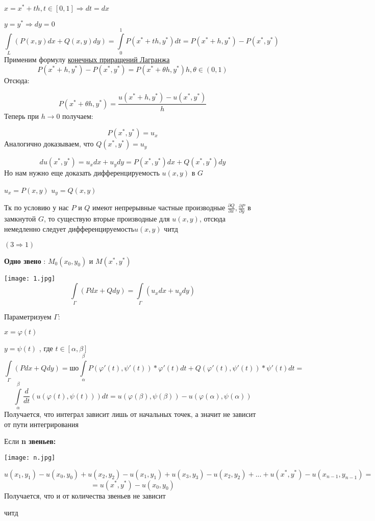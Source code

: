 \documentclass[12pt, english]{article}
\begin{document}
	$x = x^* + th , t \in [0,1] \Rightarrow dt = dx$
	
	$y = y^* \Rightarrow dy = 0$
$$
\int\limits_{L} (P(x,y)dx + Q(x,y)dy) = \int\limits_{0}^{1}P(x^* + th,y^*)dt
=
P(x^* + h,y^*) - P(x^*,y^*)
$$	
Применим формулу \hyperref[eq5]{конечных приращений Лагранжа}
$$
P(x^* + h,y^*) - P(x^*,y^*) = P(x^* + \theta h,y^*)h  ,\theta \in (0,1)
$$
Отсюда:
	
$$
P(x^* + \theta h,y^*) 
=
\frac{u(x^* + h , y^*) - u(x^* , y^*)}{h}
$$
Теперь при $h \to 0$	 получаем:

$$
P(x^* , y^*) 
=
u_x
$$
Аналогично доказываем, что $Q(x^* , y^*) = u_y$

$$
du(x^* , y^*) = u_x dx + u_y dy = P(x^* , y^*) dx + Q(x^* , y^*) dy
$$
Но нам нужно еще доказать дифференцируемость $u(x,y)$ в $G$

$u_x = P(x , y)$
$u_y = Q(x , y)$

Тк по условию у нас $P$ и $Q$ имеют непрерывные частные производные $\frac{\partial Q}{\partial x},\frac{\partial P}{\partial y} $ в замкнутой $G$, то существую вторые производные для $u(x,y)$, отсюда немедленно следует дифференцируемость$u(x,y)$
читд	
	
$(3 \Rightarrow 1)$	

\textbf{Одно звено} : $M_0(x_0 , y_0)$ и $M(x^* , y^*)$ 

\texttt{[image: 1.jpg]}
$$
\int\limits_{\Gamma} (Pdx + Qdy) 
=
\int\limits_{\Gamma} (u_xdx + u_ydy) 
$$

Параметризуем $\Gamma$:

 $ x = \varphi(t)$
 
 $ y = \psi(t)$ , где $t \in [\alpha , \beta]$
$$
\int\limits_{\Gamma} (Pdx + Qdy)
=шо
\int\limits_{\alpha}^{\beta} P(\varphi'(t) , \psi'(t))*\varphi'(t)dt 
+ Q(\varphi'(t) , \psi'(t))*\psi'(t)dt 
=
$$
$$
\int\limits_{\alpha}^{\beta} \frac{d}{dt}(u(\varphi(t) ,\psi(t)))dt 
= 
u(\varphi(\beta) ,\psi(\beta)) -  u(\varphi(\alpha) ,\psi(\alpha))
$$
Получается, что интеграл зависит лишь от начальных точек, а значит не зависит от пути интегрирования

Если \textbf{n звеньев:}

\texttt{[image: n.jpg]}	

$$
u(x_1 , y_1) - u(x_0 , y_0) 
+ 
u(x_2 , y_2) - u(x_1 , y_1)
+ 
u(x_3 , y_3) - u(x_2 , y_2)
+ ... +
u(x^* , y^*) - u(x_{n-1} , y_{n-1})
=
$$
$$
=
u(x^* , y^*) - u(x_0 , y_0)
$$
Получается, что и от количества звеньев не зависит

читд
\end{document}
